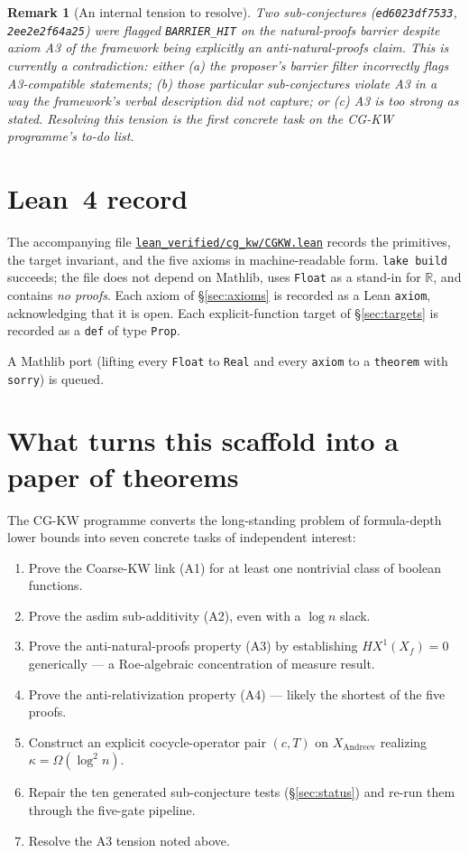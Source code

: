 \documentclass[11pt,a4paper]{article}
\newtheorem*{remark*}{Remark}
\begin{document}
\begin{remark*}[An internal tension to resolve]
Two sub-conjectures (\texttt{ed6023df7533}, \texttt{2ee2e2f64a25}) were
flagged \texttt{BARRIER\_HIT} on the natural-proofs barrier despite axiom
A3 of the framework being explicitly an \emph{anti}-natural-proofs claim.
This is currently a contradiction: either (a) the proposer's barrier
filter incorrectly flags A3-compatible statements; (b) those particular
sub-conjectures violate A3 in a way the framework's verbal description
did not capture; or (c) A3 is too strong as stated. Resolving this
tension is the first concrete task on the CG-KW programme's to-do
list.
\end{remark*}

\section{Lean~4 record}\label{sec:lean}

The accompanying file
\href{https://github.com/ludwigkubler/SperimentalMath/blob/main/lean_verified/cg_kw/CGKW.lean}{\texttt{lean\_verified/cg\_kw/CGKW.lean}}
records the primitives, the target invariant, and the five axioms in
machine-readable form. \texttt{lake build} succeeds; the file does not
depend on Mathlib, uses \texttt{Float} as a stand-in for $\mathbb{R}$,
and contains \emph{no proofs}. Each axiom of \S\ref{sec:axioms} is
recorded as a Lean \texttt{axiom}, acknowledging that it is open. Each
explicit-function target of \S\ref{sec:targets} is recorded as a
\texttt{def} of type \texttt{Prop}.

A Mathlib port (lifting every \texttt{Float} to \texttt{Real} and every
\texttt{axiom} to a \texttt{theorem} with \texttt{sorry}) is queued.

\section{What turns this scaffold into a paper of theorems}

The CG-KW programme converts the long-standing problem of formula-depth
lower bounds into seven concrete tasks of independent interest:

\begin{enumerate}
\item Prove the Coarse-KW link (A1) for at least one nontrivial class
of boolean functions.
\item Prove the asdim sub-additivity (A2), even with a $\log n$ slack.
\item Prove the anti-natural-proofs property (A3) by establishing
$HX^1(X_f) = 0$ generically — a Roe-algebraic concentration of
measure result.
\item Prove the anti-relativization property (A4) — likely the
shortest of the five proofs.
\item Construct an explicit cocycle-operator pair $(c, T)$ on
$X_{\mathrm{Andreev}}$ realizing $\kappa = \Omega(\log^2 n)$.
\item Repair the ten generated sub-conjecture tests
(\S\ref{sec:status}) and re-run them through the
five-gate pipeline.
\item Resolve the A3 tension noted above.
\end{enumerate}
\end{document}
